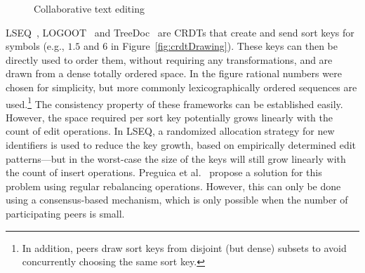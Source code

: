 \documentclass[11pt,a4paper]{article}
\begin{document}
\begin{figure}[t]
{}
\caption{Collaborative text editing}%
\end{figure}%

LSEQ~\cite{nedelec2013lseq}, LOGOOT~\cite{weiss2009logoot} and TreeDoc~\cite{preguica2009commutative} are CRDTs that create and send sort keys for symbols (e.g., $1.5$ and $6$ in Figure~\ref{fig:crdtDrawing}).
These keys can then be directly used to order them, without requiring any transformations, and are drawn from a dense totally ordered space.
In the figure rational numbers were chosen for simplicity, but more commonly lexicographically ordered sequences are used.\footnote{In addition, peers draw sort keys from disjoint (but dense) subsets to avoid concurrently choosing the same sort key.}
The consistency property of these frameworks can be established easily.
However, the space required per sort key potentially grows linearly with the count of edit operations.
In LSEQ, a randomized allocation strategy for new identifiers is used to reduce the key growth, based on empirically determined edit patterns---but in the worst-case the size of the keys will still grow linearly with the count of insert operations.
Preguica et al.~\cite{preguica2009commutative} propose a solution for this problem using regular rebalancing operations.
However, this can only be done using a consensus\hyp{}based mechanism, which is only possible when the number of participating peers is small.
\end{document}
